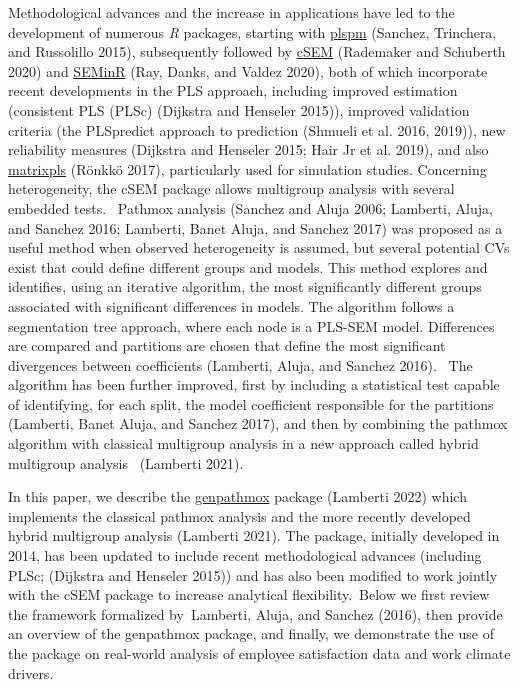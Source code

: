 Methodological advances and the increase in applications have led to the
development of numerous \emph{R} packages, starting with
\href{https://CRAN.R-project.org/package=plspm}{plspm} (Sanchez, Trinchera, and Russolillo 2015), subsequently
followed by \href{https://CRAN.R-project.org/package=cSEM}{cSEM} (Rademaker and Schuberth 2020) and
\href{https://CRAN.R-project.org/package=SEMinR}{SEMinR} (Ray, Danks, and Valdez 2020), both of
which incorporate recent developments in the PLS approach, including
improved estimation (consistent PLS (PLSc) (Dijkstra and Henseler 2015)), improved
validation criteria (the PLSpredict approach to prediction
(Shmueli et al. 2016, 2019)), new reliability measures
(Dijkstra and Henseler 2015; Hair Jr et al. 2019), and also
\href{https://CRAN.R-project.org/package=matrixpls}{matrixpls} (Rönkkö 2017),
particularly used for simulation studies. Concerning heterogeneity, the
cSEM package allows multigroup analysis with several embedded tests.~
Pathmox analysis (Sanchez and Aluja 2006; Lamberti, Aluja, and Sanchez 2016; Lamberti, Banet Aluja, and Sanchez 2017) was proposed as
a useful method when observed heterogeneity is assumed, but several
potential CVs exist that could define different groups and models. This
method explores and identifies, using an iterative algorithm, the most
significantly different groups associated with significant differences
in models. The algorithm follows a segmentation tree approach, where
each node is a PLS-SEM model. Differences are compared and partitions
are chosen that define the most significant divergences between
coefficients (Lamberti, Aluja, and Sanchez 2016). ~The algorithm has been further improved,
first by including a statistical test capable of identifying, for each
split, the model coefficient responsible for the partitions
(Lamberti, Banet Aluja, and Sanchez 2017), and then by combining the pathmox algorithm with
classical multigroup analysis in a new approach called hybrid multigroup
analysis ~(Lamberti 2021).~

In this paper, we describe the
\href{https://CRAN.R-project.org/package=genpathmox}{genpathmox} package
(Lamberti 2022) which implements the classical pathmox analysis and the
more recently developed hybrid multigroup analysis (Lamberti 2021). The
package, initially developed in 2014, has been updated to include recent
methodological advances (including PLSc; (Dijkstra and Henseler 2015)) and has also
been modified to work jointly with the cSEM package to increase
analytical flexibility.~Below we first review the framework formalized
by~Lamberti, Aluja, and Sanchez (2016), then provide an overview of the genpathmox package, and
finally, we demonstrate the use of the package on real-world analysis of
employee satisfaction data and work climate drivers.

